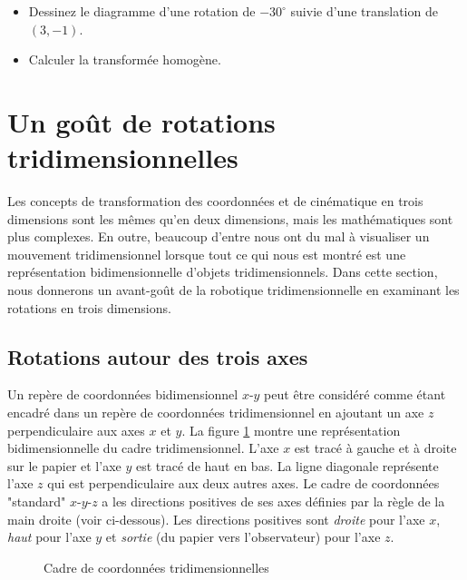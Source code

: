\begin{framed}
\begin{itemize}
\item Dessinez le diagramme d'une rotation de $-30^\circ$ suivie d'une translation de $(3,-1)$.
\item Calculer la transformée homogène.
\end{itemize}
\end{framed}


\section{Un goût de rotations tridimensionnelles}\label{s.three}

Les concepts de transformation des coordonnées et de cinématique en trois dimensions sont les mêmes qu'en deux dimensions, mais les mathématiques sont plus complexes. En outre, beaucoup d'entre nous ont du mal à visualiser un mouvement tridimensionnel lorsque tout ce qui nous est montré est une représentation bidimensionnelle d'objets tridimensionnels. Dans cette section, nous donnerons un avant-goût de la robotique tridimensionnelle en examinant les rotations en trois dimensions.

\subsection{Rotations autour des trois axes}\label{s.rotation-notation}

Un repère de coordonnées bidimensionnel $x$-$y$ peut être considéré comme étant encadré dans un repère de coordonnées tridimensionnel en ajoutant un axe $z$ perpendiculaire aux axes $x$ et $y$. La figure \ref{fig.frame} montre une représentation bidimensionnelle du cadre tridimensionnel. L'axe $x$ est tracé à gauche et à droite sur le papier et l'axe $y$ est tracé de haut en bas. La ligne diagonale représente l'axe $z$ qui est perpendiculaire aux deux autres axes. Le cadre de coordonnées "standard" $x$-$y$-$z$ a les directions positives de ses axes définies par la règle de la main droite (voir ci-dessous). Les directions positives sont \textit{droite} pour l'axe $x$, \textit{haut} pour l'axe $y$ et \textit{sortie} (du papier vers l'observateur) pour l'axe $z$. 

\begin{figure}
\begin{center}
\caption{Cadre de coordonnées tridimensionnelles}\label{fig.frame}
\end{center}
\end{figure}

